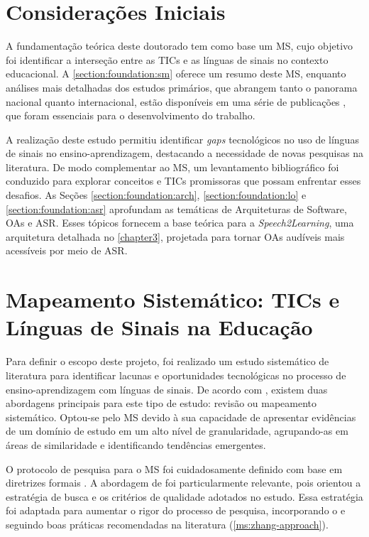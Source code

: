 \section{Considerações Iniciais}

A fundamentação teórica deste doutorado tem como base um MS, cujo objetivo foi identificar a interseção entre as TICs e as línguas de sinais no contexto educacional. A \autoref{section:foundation:sm} oferece um resumo deste MS, enquanto análises mais detalhadas dos estudos primários, que abrangem tanto o panorama nacional quanto internacional, estão disponíveis em uma série de publicações \cite{FalvoJr2020_FIE, FalvoJr2020_SBIE, FalvoJr2021_RENOTE}, que foram essenciais para o desenvolvimento do trabalho.

A realização deste estudo permitiu identificar \textit{gaps} tecnológicos no uso de línguas de sinais no ensino-aprendizagem, destacando a necessidade de novas pesquisas na literatura. De modo complementar ao MS, um levantamento bibliográfico foi conduzido para explorar conceitos e TICs promissoras que possam enfrentar esses desafios. As Seções \ref{section:foundation:arch}, \ref{section:foundation:lo} e \ref{section:foundation:asr} aprofundam as temáticas de Arquiteturas de Software, OAs e ASR. Esses tópicos fornecem a base teórica para a \textit{Speech2Learning}, uma arquitetura detalhada no \autoref{chapter3}, projetada para tornar OAs audíveis mais acessíveis por meio de ASR.

\section{Mapeamento Sistemático: TICs e Línguas de Sinais na Educação}
\label{section:foundation:sm}

Para definir o escopo deste projeto, foi realizado um estudo sistemático de literatura para identificar lacunas e oportunidades tecnológicas no processo de ensino-aprendizagem com línguas de sinais. De acordo com , existem duas abordagens principais para este tipo de estudo: revisão ou mapeamento sistemático. Optou-se pelo MS devido à sua capacidade de apresentar evidências de um domínio de estudo em um alto nível de granularidade, agrupando-as em áreas de similaridade e identificando tendências emergentes.

O protocolo de pesquisa para o MS foi cuidadosamente definido com base em diretrizes formais  \cite{Kitchenham2007, Nakagawa2010, Zhang2011, Petersen2015}. A abordagem de  foi particularmente relevante, pois orientou a estratégia de busca e os critérios de qualidade adotados no estudo. Essa estratégia foi adaptada para aumentar o rigor do processo de pesquisa, incorporando o  e seguindo boas práticas recomendadas na literatura (\autoref{ms:zhang-approach}).

